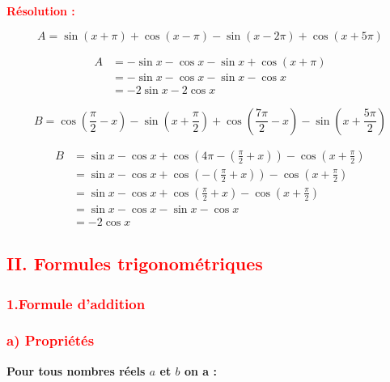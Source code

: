 \documentclass[a4paper,12pt]{article}
\begin{document}
\textbf{\textcolor{red}{Résolution :}}

\[
A = \sin(x + \pi) + \cos(x - \pi) - \sin(x - 2\pi) + \cos(x + 5\pi)
\]

\[
\begin{aligned}
A &= -\sin x - \cos x - \sin x + \cos(x + \pi) \\
  &= -\sin x - \cos x - \sin x - \cos x \\
  &= -2\sin x -2\cos x
\end{aligned}
\]

\medskip

\[
B = \cos\left(\frac{\pi}{2} - x\right) - \sin\left(x + \frac{\pi}{2}\right) + \cos\left(\frac{7\pi}{2} - x\right) - \sin\left(x + \frac{5\pi}{2}\right)
\]

\[
\begin{aligned}
B &= \sin x - \cos x + \cos\left(4\pi - \left(\frac{\pi}{2} + x\right)\right) - \cos\left(x + \frac{\pi}{2}\right) \\
  &= \sin x - \cos x + \cos\left(-\left(\frac{\pi}{2} + x\right)\right) - \cos\left(x + \frac{\pi}{2}\right) \\
  &= \sin x - \cos x + \cos\left(\frac{\pi}{2} + x\right) - \cos\left(x + \frac{\pi}{2}\right) \\
  &= \sin x - \cos x - \sin x - \cos x \\
  &= -2\cos x
\end{aligned}
\]

\subsection*{\textcolor{red}{II. Formules trigonométriques}}
\subsubsection*{\textcolor{red}{1.Formule d’addition }}
\subsubsection*{\textcolor{red}{a) Propriétés }}

\noindent
\textbf{Pour tous nombres réels $a$ et $b$ on a :}

\vspace{1em}
\end{document}
